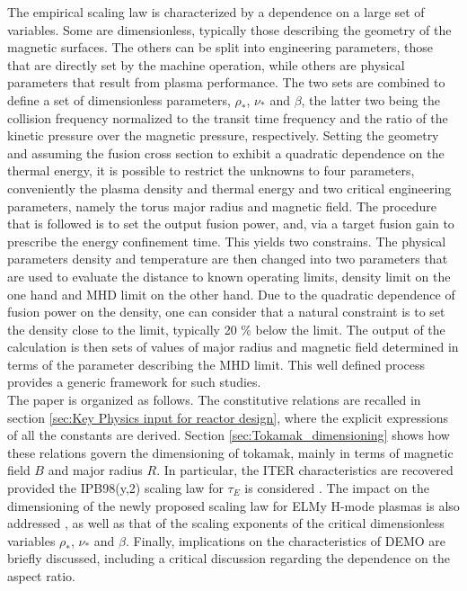\documentclass[12pt]{iopart}
\begin{document}
The empirical scaling law is characterized by a dependence on a large set of variables. Some are dimensionless, typically those describing the geometry of the magnetic surfaces. The others can be split into engineering parameters, those that are directly set by the machine operation, while others are physical parameters that result from plasma performance. The two sets are combined to define a set of dimensionless parameters, $\rho_*$, $\nu_*$ and $\beta$, the latter two being the collision frequency normalized to the transit time frequency and the ratio of the kinetic pressure over the magnetic pressure, respectively. Setting the geometry and assuming the fusion cross section to exhibit a quadratic dependence on the thermal energy, it is possible to restrict the unknowns to four parameters, conveniently the plasma density and thermal energy and two critical engineering parameters, namely the torus major radius and magnetic field. The procedure that is followed is to set the output fusion power, and, via a target fusion gain to prescribe the energy confinement time. This yields two constrains. The physical parameters density and temperature are then changed into two parameters that are used to evaluate the distance to known operating limits, density limit on the one hand and MHD limit on the other hand. Due to the quadratic dependence of fusion power on the density, one can consider that a natural constraint is to set the density close to the limit, typically 20 \% below the limit. The output of the calculation is then sets of values of major radius and magnetic field determined in terms of the parameter describing the MHD limit. This well defined process provides a generic framework for such studies.  \\

The paper is organized as follows. The constitutive relations are recalled in section \ref{sec:Key Physics input for reactor design}, where the explicit expressions of all the constants are derived. Section \ref{sec:Tokamak_dimensioning} shows how these relations govern the dimensioning of tokamak, mainly in terms of magnetic field $B$ and major radius $R$. In particular, the ITER characteristics are recovered provided the IPB98(y,2) scaling law for $\tau_E$ is considered \cite{ITERphysics_chap2}. The impact on the dimensioning of the newly proposed scaling law for ELMy H-mode plasmas is also addressed \cite{Sips2018}, as well as that of the scaling exponents of the critical dimensionless variables $\rho_*$, $\nu_*$ and $\beta$. Finally, implications on the characteristics of DEMO are briefly discussed, including a critical discussion regarding the dependence on the aspect ratio.
\end{document}

